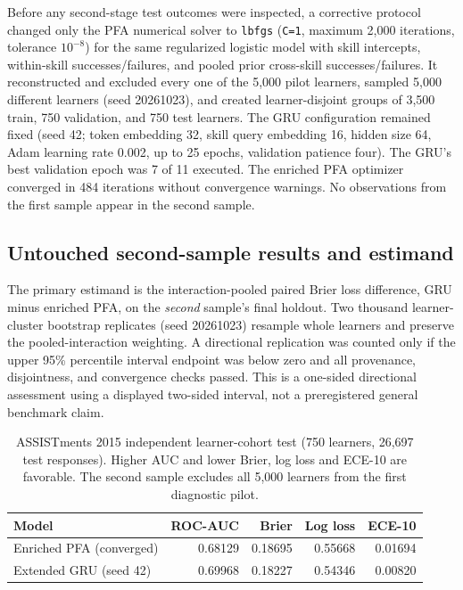\documentclass[11pt,a4paper]{article}
\begin{document}
Before any second-stage test outcomes were inspected, a corrective protocol changed only the PFA numerical solver to \texttt{lbfgs} (\texttt{C=1}, maximum 2,000 iterations, tolerance $10^{-8}$) for the same regularized logistic model with skill intercepts, within-skill successes/failures, and pooled prior cross-skill successes/failures. It reconstructed and excluded every one of the 5,000 pilot learners, sampled 5,000 different learners (seed 20261023), and created learner-disjoint groups of 3,500 train, 750 validation, and 750 test learners. The GRU configuration remained fixed (seed 42; token embedding 32, skill query embedding 16, hidden size 64, Adam learning rate 0.002, up to 25 epochs, validation patience four). The GRU's best validation epoch was 7 of 11 executed. The enriched PFA optimizer converged in 484 iterations without convergence warnings. No observations from the first sample appear in the second sample.

\subsection{Untouched second-sample results and estimand}
The primary estimand is the interaction-pooled paired Brier loss difference, GRU minus enriched PFA, on the \emph{second} sample's final holdout. Two thousand learner-cluster bootstrap replicates (seed 20261023) resample whole learners and preserve the pooled-interaction weighting. A directional replication was counted only if the upper 95\% percentile interval endpoint was below zero and all provenance, disjointness, and convergence checks passed. This is a one-sided directional assessment using a displayed two-sided interval, not a preregistered general benchmark claim.

\begin{table}[ht]\centering\small
\caption{ASSISTments 2015 independent learner-cohort test (750 learners, 26,697 test responses). Higher AUC and lower Brier, log loss and ECE-10 are favorable. The second sample excludes all 5,000 learners from the first diagnostic pilot.}
\label{tab:cohort2015}
\begin{tabular}{lrrrr}\toprule
Model & ROC-AUC & Brier & Log loss & ECE-10\\\midrule
Enriched PFA (converged) & 0.68129 & 0.18695 & 0.55668 & 0.01694\\
Extended GRU (seed 42) & 0.69968 & 0.18227 & 0.54346 & 0.00820\\\bottomrule
\end{tabular}
\end{table}
\end{document}
